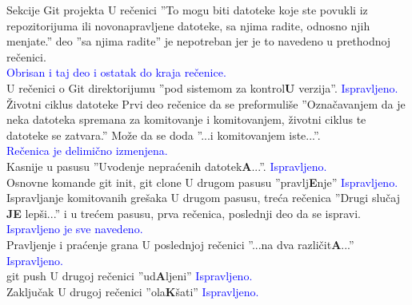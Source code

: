 \documentclass[a4paper]{report}
\newcommand{\odgovor}[1]{\textcolor{blue}{#1}}
\begin{document}
Sekcije Git projekta\newline
U rečenici ''To mogu biti datoteke koje ste povukli iz repozitorijuma ili novonapravljene datoteke, sa njima radite, odnosno njih menjate.'' deo ''sa njima radite'' je nepotreban jer je to navedeno u prethodnoj rečenici.\\
\odgovor{Obrisan i taj deo i ostatak do kraja rečenice.}\\

U rečenici o Git direktorijumu ''pod sistemom za kontrol\textbf{U} verzija''.\newline
\odgovor{Ispravljeno.}\\

Životni ciklus datoteke
Prvi deo rečenice da se preformuliše ''Označavanjem da je neka datoteka spremana za komitovanje i
komitovanjem, životni ciklus te datoteke se zatvara.'' Može da se doda ''...i komitovanjem iste...''.\\
\odgovor{Rečenica je delimično izmenjena.}\\

Kasnije u pasusu ''Uvodenje nepraćenih datotek\textbf{A}...''.\newline
\odgovor{Ispravljeno.}\\

Osnovne komande\newline
git init, git clone \newline
U drugom pasusu ''pravlj\textbf{E}nje''\newline
\odgovor{Ispravljeno.}\\

Ispravljanje komitovanih grešaka\newline
U drugom pasusu, treća rečenica  ''Drugi slučaj \textbf{JE} lepši...'' i u trećem pasusu, prva rečenica, poslednji deo da se ispravi.\newline
\odgovor{Ispravljeno je sve navedeno.}\\

Pravljenje i praćenje grana\newline
U poslednjoj rečenici ''...na dva različit\textbf{A}...''\newline
\odgovor{Ispravljeno.}\\

git push\newline
U drugoj rečenici ''ud\textbf{A}ljeni''\newline
\odgovor{Ispravljeno.}\\

Zaključak\newline
U drugoj rečenici ''ola\textbf{K}šati''\newline
\odgovor{Ispravljeno.}\\
\end{document}
